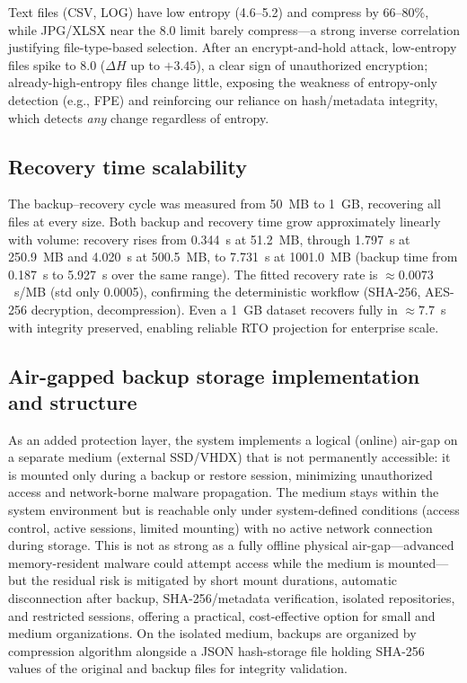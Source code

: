 \documentclass{iaesarticle}
\begin{document}
Text files (CSV, LOG) have low entropy (4.6--5.2) and compress by 66--80\%, while JPG/XLSX near the 8.0 limit barely compress---a strong inverse correlation justifying file-type-based selection. After an encrypt-and-hold attack, low-entropy files spike to 8.0 ($\Delta H$ up to $+3.45$), a clear sign of unauthorized encryption; already-high-entropy files change little, exposing the weakness of entropy-only detection (e.g., FPE) and reinforcing our reliance on hash/metadata integrity, which detects \textit{any} change regardless of entropy.

\subsection{Recovery time scalability}
The backup--recovery cycle was measured from 50~MB to 1~GB, recovering all files at every size. Both backup and recovery time grow approximately linearly with volume: recovery rises from 0.344~s at 51.2~MB, through 1.797~s at 250.9~MB and 4.020~s at 500.5~MB, to 7.731~s at 1001.0~MB (backup time from 0.187~s to 5.927~s over the same range). The fitted recovery rate is $\approx0.0073$~s/MB (std only 0.0005), confirming the deterministic workflow (SHA-256, AES-256 decryption, decompression). Even a 1~GB dataset recovers fully in $\approx7.7$~s with integrity preserved, enabling reliable RTO projection for enterprise scale.

\subsection{Air-gapped backup storage implementation and structure}
As an added protection layer, the system implements a logical (online) air-gap on a separate medium (external SSD/VHDX) that is not permanently accessible: it is mounted only during a backup or restore session, minimizing unauthorized access and network-borne malware propagation. The medium stays within the system environment but is reachable only under system-defined conditions (access control, active sessions, limited mounting) with no active network connection during storage. This is not as strong as a fully offline physical air-gap---advanced memory-resident malware could attempt access while the medium is mounted---but the residual risk is mitigated by short mount durations, automatic disconnection after backup, SHA-256/metadata verification, isolated repositories, and restricted sessions, offering a practical, cost-effective option for small and medium organizations. On the isolated medium, backups are organized by compression algorithm alongside a JSON hash-storage file holding SHA-256 values of the original and backup files for integrity validation.
\end{document}
